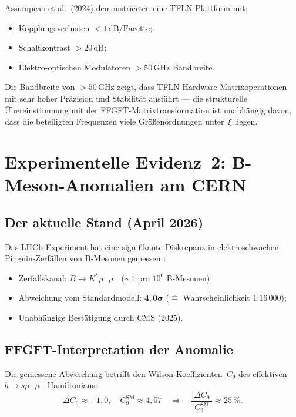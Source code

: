Assumpcao et al.\ (2024) \cite{Assumpcao2024} demonstrierten eine
TFLN-Plattform mit:
\begin{itemize}
  \item Kopplungsverlusten $< 1\,\text{dB/Facette}$;
  \item Schaltkontrast $> 20\,\text{dB}$;
  \item Elektro-optischen Modulatoren $> 50\,\text{GHz}$ Bandbreite.
\end{itemize}
Die Bandbreite von $>50\,\text{GHz}$ zeigt, dass TFLN-Hardware
Matrixoperationen mit sehr hoher Präzision und Stabilität ausführt —
die strukturelle Übereinstimmung mit der FFGFT-Matrixtransformation
ist unabhängig davon, dass die beteiligten Frequenzen viele
Größenordnungen unter~$\xi$ liegen.

\section{Experimentelle Evidenz~2: B-Meson-Anomalien am CERN}

\subsection{Der aktuelle Stand (April 2026)}

Das LHCb-Experiment hat eine signifikante Diskrepanz in elektroschwachen
Pinguin-Zerfällen von B-Mesonen gemessen \cite{CERN2026a,CERN2026b}:

\begin{itemize}
  \item Zerfallskanal: $B \to K^*\mu^+\mu^-$ ($\sim 1$ pro $10^6$ B-Mesonen);
  \item Abweichung vom Standardmodell: $\mathbf{4{,}0\sigma}$
        ($\hat{=}$ Wahrscheinlichkeit 1:16\,000);
  \item Unabhängige Bestätigung durch CMS (2025).
\end{itemize}

\subsection{FFGFT-Interpretation der Anomalie}

Die gemessene Abweichung betrifft den Wilson-Koeffizienten~$C_9$
des effektiven $b \to s\mu^+\mu^-$-Hamiltonians:
\begin{equation}
  \Delta C_9 \approx -1{,}0, \quad
  C_9^{\text{SM}} \approx 4{,}07
  \quad\Rightarrow\quad
  \frac{|\Delta C_9|}{C_9^{\text{SM}}} \approx 25\,\%.
\end{equation}

